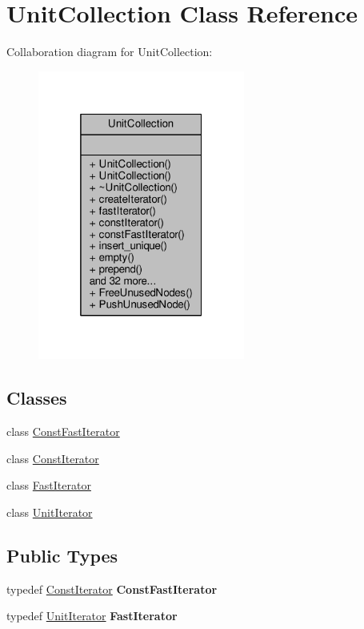 \hypertarget{classUnitCollection}{}\section{Unit\+Collection Class Reference}
\label{classUnitCollection}


Collaboration diagram for Unit\+Collection\+:
\nopagebreak
\begin{figure}[H]
\begin{center}
\leavevmode
\includegraphics[width=193pt]{d8/dee/classUnitCollection__coll__graph}
\end{center}
\end{figure}
\subsection*{Classes}
\begin{DoxyCompactItemize}
\item 
class \hyperlink{classUnitCollection_1_1ConstFastIterator}{Const\+Fast\+Iterator}
\item 
class \hyperlink{classUnitCollection_1_1ConstIterator}{Const\+Iterator}
\item 
class \hyperlink{classUnitCollection_1_1FastIterator}{Fast\+Iterator}
\item 
class \hyperlink{classUnitCollection_1_1UnitIterator}{Unit\+Iterator}
\end{DoxyCompactItemize}
\subsection*{Public Types}
\begin{DoxyCompactItemize}
\item 
typedef \hyperlink{classUnitCollection_1_1ConstIterator}{Const\+Iterator} {\bfseries Const\+Fast\+Iterator}\hypertarget{classUnitCollection_a3031416ffed96673e6146a5652013136}{}\label{classUnitCollection_a3031416ffed96673e6146a5652013136}

\item 
typedef \hyperlink{classUnitCollection_1_1UnitIterator}{Unit\+Iterator} {\bfseries Fast\+Iterator}\hypertarget{classUnitCollection_a7eb6b47e7faae806cf10f0e1b692a146}{}\label{classUnitCollection_a7eb6b47e7faae806cf10f0e1b692a146}

\end{DoxyCompactItemize}
